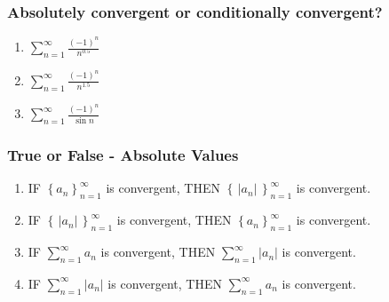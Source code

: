 \begin{frame}[t]
	\frametitle{Absolutely convergent or conditionally convergent?}

	\begin{enumerate}
		\item $\displaystyle \sum_{n=1}^{\infty}\frac{(-1)^{n}}{n^{0.5}}$
			\vspace{.5cm}

		\item $\displaystyle \sum_{n=1}^{\infty}\frac{(-1)^{n}}{n^{1.5}}$
			\vspace{.5cm}

		\item $\displaystyle \sum_{n=1}^{\infty}\frac{(-1)^{n}}{\sin n}$
			\vspace{.5cm}
	\end{enumerate}
\end{frame}

\begin{frame}[t]
	\fontsize{13}{13}\selectfont
	\frametitle{ True or False - Absolute Values}

	\begin{enumerate}
		\item IF {\color{blue} $\displaystyle \left\{ a_{n}\right\}_{n=1}^{\infty}$}
			is convergent, \quad THEN
			{\color{red} $\displaystyle \left\{ \, |a_{n}| \, \right\}_{n=1}^{\infty}$}
			is convergent.
			\vspace{.5cm}

		\item IF {\color{red} $\displaystyle \left\{ \, |a_{n}| \, \right\}_{n=1}^{\infty}$}
			is convergent, \quad THEN
			{\color{blue} $\displaystyle \left\{ a_{n}\right\}_{n=1}^{\infty}$} is
			convergent.
			\vspace{.5cm}

		\item IF \; {\color{blue} $\displaystyle \sum_{n=1}^{\infty}a_{n}$} \; is convergent,
			\quad THEN \; {\color{red} $\displaystyle \sum_{n=1}^{\infty}|a_{n}|$} \;
			is convergent.
			\vspace{.2cm}

		\item IF \; {\color{red} $\displaystyle \sum_{n=1}^{\infty}|a_{n}|$} \; is convergent,
			\quad THEN \; {\color{blue} $\displaystyle \sum_{n=1}^{\infty}a_{n}$} \;
			is convergent.
	\end{enumerate}
\end{frame}

